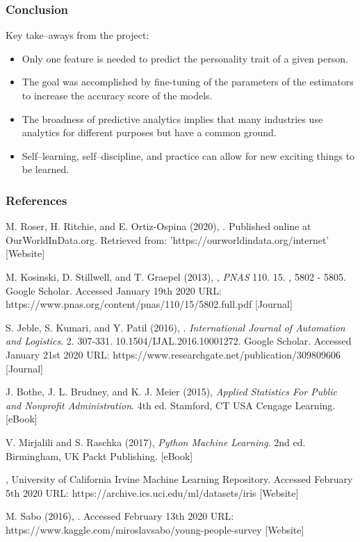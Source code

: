 \documentclass{beamer}
\begin{document}
\begin{frame}
\frametitle{Conclusion}
\footnotesize
Key take--aways from the project:
\begin{itemize}
\item Only one feature is needed to predict the personality trait of a given person.
\item The goal was accomplished by fine-tuning of the parameters of the estimators to increase the accuracy score of the models.
\item The broadness of predictive analytics implies that many industries use analytics for different purposes but have a common ground.
\item Self--learning, self--discipline, and practice can allow for new exciting things to be learned.
\end{itemize}

\end{frame}


\begin{frame}
\frametitle{References}
\tiny
\begin{thebibliography}{9}

M. Roser, H. Ritchie, and E. Ortiz-Ospina (2020),
. Published online at OurWorldInData.org. Retrieved from: 'https://ourworldindata.org/internet' [Website]

M. Kosinski, D. Stillwell, and T. Graepel (2013),
, \textit{PNAS} 110. 15. , 5802 - 5805. Google Scholar. Accessed January 19th 2020 URL: https://www.pnas.org/content/pnas/110/15/5802.full.pdf [Journal]

S. Jeble, S. Kumari, and Y. Patil (2016),
. \textit{International Journal of Automation and Logistics}. 2. 307-331. 10.1504/IJAL.2016.10001272. Google Scholar. Accessed January 21st 2020 URL: https://www.researchgate.net/publication/309809606 [Journal]

J. Bothe, J. L. Brudney, and K. J. Meier (2015), 
\textit{Applied Statistics For Public and Nonprofit Administration}. 4th ed. Stamford, CT USA Cengage Learning. [eBook]

V. Mirjalili and S. Raschka (2017),
\textit{Python Machine Learning}. 2nd ed. Birmingham, UK Packt Publishing. [eBook]

, University of California Irvine Machine Learning Repository. Accessed February 5th 2020 URL: https://archive.ics.uci.edu/ml/datasets/iris [Website]

M. Sabo (2016), . Accessed February 13th 2020 URL: https://www.kaggle.com/miroslavsabo/young-people-survey [Website]

\end{thebibliography}
\end{frame}
\end{document}
